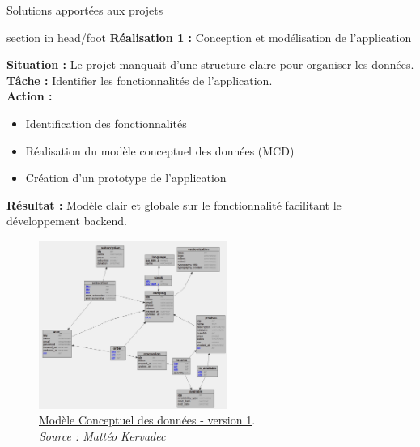 \documentclass{beamer}
\begin{document}
\begin{frame}[label=realisation]{Solutions apportées aux projets}
	\begin{beamercolorbox}[wd=\paperwidth,ht=1.5em,dp=0.5em,leftskip=0.5cm]{section in head/foot}
  		\large \textbf{Réalisation 1 :} \normalsize Conception et modélisation de l'application
	\end{beamercolorbox}
	\vspace{0.5em}

	\begin{center}
  		 {
  			\begin{minipage}{0.9\textwidth}
  				\textbf{Situation :} Le projet manquait d’une structure claire pour organiser les données.\\
  				\textbf{Tâche :} Identifier les fonctionnalités de l'application.\\
  				\textbf{Action :}
  			  		\begin{itemize}
  						\item Identification des fonctionnalités
  						\item Réalisation du modèle conceptuel des données (MCD)
  						\item Création d'un prototype de l'application
  					\end{itemize}
				\textbf{Résultat :} Modèle clair et globale sur le fonctionnalité facilitant le développement backend.
			\end{minipage}
		}
		\only<2> {
			\begin{figure}[t]
  				\includegraphics[height=5.5cm]{../img/conception/mcd_V1.jpg}
				\caption{	
					\centering			
  					\href{https://github.com/Matteo-K/Soutenance_E-delic/blob/main/img/conception/mcd_V1.jpg}{\underline{Modèle Conceptuel des données - version 1}}.\\
  					\textit{Source : Mattéo Kervadec}
				}
  				\label{fig:mcdV1}
  			\end{figure}
		}
		\only<3> {
			\addtocounter{figure}{1}
}
\end{center}
\end{frame}
\end{document}
